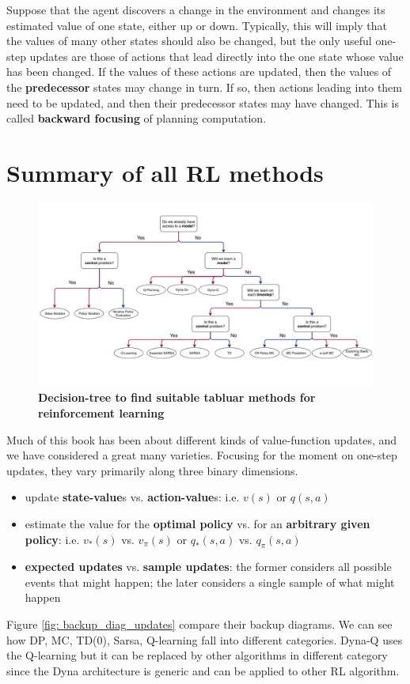 \documentclass[11pt]{article}
\begin{document}
Suppose that the agent discovers a change in the environment and changes its estimated value of one state, either up or down. Typically, this will imply that the values of many other states should also be changed, but the only useful one-step updates are those of actions that lead directly into the one state whose value has been changed. If the values of these actions are updated, then the values of the \textbf{predecessor} states may change in turn. If so, then actions leading into them need to be updated, and
then their predecessor states may have changed. This is called \textbf{backward focusing} of planning computation. 

\section{Summary of all RL methods}
\begin{figure}
\begin{minipage}[t]{1\linewidth}
  \centering
  \centerline{\includegraphics[scale = 0.3]{diagram_tabluar_methods.png}}
\end{minipage}
\caption{\footnotesize{\textbf{Decision-tree to find suitable tabluar methods for reinforcement learning}}}
\label{fig: tabluar_methods_diagram}
\end{figure}
Much of this book has been about different kinds of value-function updates, and we have considered a great many varieties. Focusing for the moment on one-step updates, they vary primarily along three binary dimensions. 
\begin{itemize}
\item update \textbf{state-value}s vs. \textbf{action-value}s: i.e. $v(s)$ or $q(s, a)$
\item estimate the value for the \textbf{optimal policy} vs. for an \textbf{arbitrary given policy}: i.e. $v_{*}(s)$ vs. $v_{\pi}(s)$ or $q_{*}(s,a)$ vs. $q_{\pi}(s,a)$
\item \textbf{expected updates} vs. \textbf{sample updates}: the former considers all possible events that might happen; the later considers a
single sample of what might happen
\end{itemize} Figure \ref{fig: backup_diag_updates} compare their backup diagrams. We can see how DP, MC, TD(0), Sarsa, Q-learning fall into different categories. Dyna-Q uses the Q-learning but it can be replaced by other algorithms in different category since the Dyna architecture is generic and can be applied to other RL algorithm. 
\end{document}
